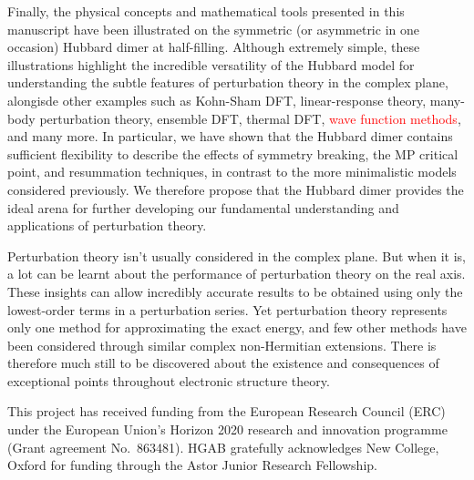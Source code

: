 \documentclass[aps,prb,reprint,noshowkeys,superscriptaddress]{revtex4-1}
\newcommand{\titou}[1]{\textcolor{red}{#1}}
\begin{document}
Finally, the physical concepts and mathematical tools presented in this manuscript have been illustrated 
on the symmetric (or asymmetric in one occasion) Hubbard dimer at half-filling.
Although extremely simple, these illustrations highlight the incredible versatility of the Hubbard model
for understanding the subtle features of perturbation theory in the complex plane, alongisde other examples 
such as Kohn-Sham DFT, \cite{Carrascal_2015,Cohen_2016} linear-response theory,\cite{Carrascal_2018} 
many-body perturbation theory,\cite{Romaniello_2009,Romaniello_2012,DiSabatino_2015,Hirata_2015,Tarantino_2017,Olevano_2019} 
ensemble DFT, \cite{Deur_2017,Deur_2018,Senjean_2018,Sagredo_2018,Fromager_2020} thermal DFT,\cite{Smith_2016,Smith_2018} 
\titou{wave function methods},\cite{Stein_2014,Henderson_2015,Shepherd_2016} and many more.
In particular, we have shown that the Hubbard dimer contains sufficient flexibility to describe 
the effects of symmetry breaking, the MP critical point, and resummation techniques, in contrast to the more 
minimalistic models considered previously.
We therefore propose that the Hubbard dimer provides the ideal arena for further developing our fundamental understanding
and applications of perturbation theory.

Perturbation theory isn't usually considered in the complex plane. 
But when it is, a lot can be learnt about the performance of perturbation theory on the real axis.
These insights can allow incredibly accurate results to be obtained using only the lowest-order terms in a perturbation series.
Yet perturbation theory represents only one method for approximating the exact energy, and few other methods
have been considered through similar complex non-Hermitian extensions.
There is therefore much still to be discovered about the existence and consequences of exceptional points
throughout electronic structure theory.

\begin{acknowledgements}
This project has received funding from the European Research Council (ERC) under the European Union's Horizon 2020 research and innovation programme (Grant agreement No.~863481).
HGAB gratefully acknowledges New College, Oxford for funding through the Astor Junior Research Fellowship.
\end{acknowledgements}


\end{document}
